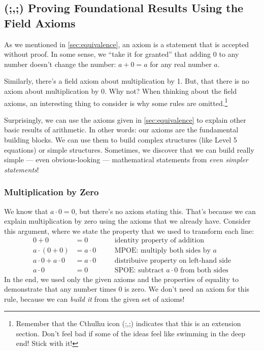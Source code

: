 \subsection{(;,;) Proving Foundational Results Using the Field Axioms}

As we mentioned in \cref{sec:equivalence}, an axiom is a statement that is accepted without proof. In some sense, we ``take it for granted'' that adding 0 to any number doesn't change the number: $a+0 = a$ for any real number $a$.

Similarly, there's a field axiom about multiplication by 1. But, that there is no axiom about multiplication by 0. Why not? When thinking about the field axioms, an interesting thing to consider is why some rules are omitted.\footnote{Remember that the Cthulhu icon (;,;) indicates that this is an extension section. Don't feel bad if some of the ideas feel like swimming in the deep end! Stick with it!}

Surprisingly, we can use the axioms given in \cref{sec:equivalence} to explain other basic results of arithmetic. In other words: our axioms are the fundamental building blocks. We can use them to build complex structures (like Level 5 equations) or simple structures. Sometimes, we discover that we can build really simple --- even obvious-looking --- mathematical statements from \textit{even simpler statements}!

\subsubsection{Multiplication by Zero}

We know that $a \cdot 0 = 0$, but there's no axiom stating this. That's because we can explain multiplication by zero using the axioms that we already have. Consider this argument, where we state the property that we used to transform each line:
\[\begin{aligned}
0 + 0 &= 0
&& \quad\text{identity property of addition}
\\
a\cdot(0+0) &= a\cdot0
&& \quad\text{MPOE: multiply both sides by $a$}
\\
a\cdot0 + a\cdot0 &= a\cdot0
&& \quad\text{distribuive property on left-hand side}
\\
a\cdot0 &= 0
&& \quad\text{SPOE: subtract $a\cdot0$ from both sides}
\end{aligned}\]
In the end, we used only the given axioms and the properties of equality to demonstrate that any number times 0 is zero. We don't need an axiom for this rule, because we can \textit{build it} from the given set of axioms!

